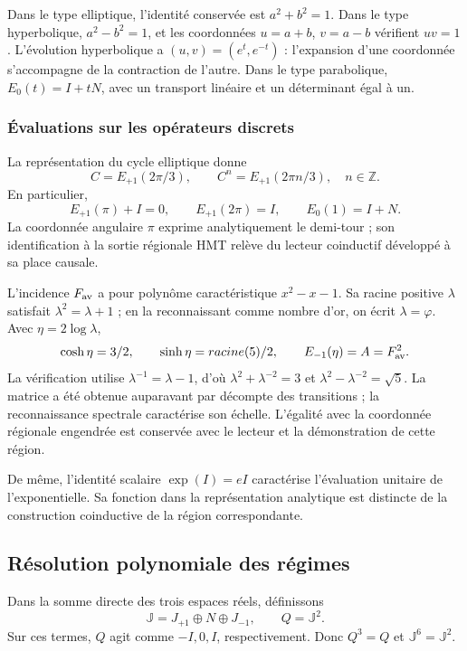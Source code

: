 Dans le type elliptique, l’identité conservée est \(a^2+b^2=1\).
Dans le type hyperbolique, \(a^2-b^2=1\), et les coordonnées \(u=a+b\),
\(v=a-b\) vérifient \(uv=1\). L’évolution hyperbolique a
\((u,v)=(e^t,e^{-t})\) : l’expansion d’une coordonnée s’accompagne
de la contraction de l’autre. Dans le type parabolique,
\(E_0(t)=I+tN\), avec un transport linéaire et un déterminant égal à un.

\subsubsection{Évaluations sur les opérateurs discrets}

La représentation du cycle elliptique donne
\[
 C=E_{+1}(2\pi/3),\qquad
 C^n=E_{+1}(2\pi n/3),\quad n\in\mathbb Z.
\]
En particulier,
\[
 E_{+1}(\pi)+I=0,\qquad E_{+1}(2\pi)=I,
 \qquad E_0(1)=I+N.
\]
La coordonnée angulaire \(\pi\) exprime analytiquement le demi-tour ;
son identification à la sortie régionale HMT relève du lecteur
coinductif développé à sa place causale.

L’incidence \(F_{\rm av}\) a pour polynôme caractéristique
\(x^2-x-1\). Sa racine positive \(\lambda\) satisfait
\(\lambda^2=\lambda+1\) ; en la reconnaissant comme nombre d’or, on écrit
\(\lambda=\varphi\). Avec \(\eta=2\log\lambda\),
\[
 \cosh\eta=\frac32,\qquad \sinh\eta=\frac{\sqrt5}{2},
 \qquad E_{-1}(\eta)=A=F_{\rm av}^2.
\]
La vérification utilise \(\lambda^{-1}=\lambda-1\), d’où
\(\lambda^2+\lambda^{-2}=3\) et
\(\lambda^2-\lambda^{-2}=\sqrt5\). La matrice a été obtenue auparavant par
décompte des transitions ; la reconnaissance spectrale caractérise son
échelle. L’égalité avec la coordonnée régionale engendrée est conservée
avec le lecteur et la démonstration de cette région.

De même, l’identité scalaire \(\exp(I)=eI\) caractérise l’évaluation
unitaire de l’exponentielle. Sa fonction dans la représentation analytique
est distincte de la construction coinductive de la région correspondante.

\subsection{Résolution polynomiale des régimes}
\label{eul:proyectores}

Dans la somme directe des trois espaces réels, définissons
\[
 \mathbb J=J_{+1}\oplus N\oplus J_{-1},\qquad Q=\mathbb J^2.
\]
Sur ces termes, \(Q\) agit comme \(-I,0,I\), respectivement.
Donc \(Q^3=Q\) et \(\mathbb J^6=\mathbb J^2\).

